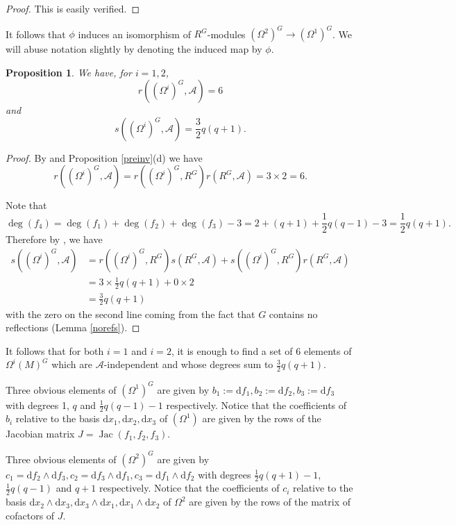 \documentclass[a4paper]{amsart}
\newcommand{\dd}{\mathrm{d}}
\def\Jac{\operatorname{Jac}}
\newtheorem{prop}[Lemma]{Proposition}
\newtheorem*{Corollary of Conjecture}{Corollary of Conjecture}
\theoremstyle{definition}
\theoremstyle{remark}
\theoremstyle{Acknowledgments}
\begin{document}
\begin{proof}
This is easily verified.
\end{proof}


It follows that $\phi$ induces an isomorphism of $R^G$-modules $(\Omega^2)^G \rightarrow (\Omega^1)^G$. We will abuse notation slightly by denoting the induced map by $\phi$.

\begin{prop}
We have, for $i=1,2$,
\[r((\Omega^i)^G,\mathcal{A}) = 6\]
and
\[s((\Omega^i)^G,\mathcal{A}) = \frac32 q(q+1).\]
\end{prop}

\begin{proof}
By \cite[Lemma~1]{BroerChuaiRelative} and Proposition \ref{preinv}(d) we have
$$r((\Omega^i)^G,\mathcal{A}) = r((\Omega^i)^G,R^G)r(R^G,\mathcal{A}) = 3 \times 2 = 6.$$

Note that $$\deg(f_4) = \deg(f_1)+\deg(f_2)+\deg(f_3) - 3 = 2+(q+1)+\frac12q(q-1)-3= \frac12 q(q+1).$$ Therefore by \cite[Lemma~1, Theorem~1]{BroerChuaiRelative}, we have
\begin{align*}
s((\Omega^i)^G,\mathcal{A}) &= r((\Omega^i)^G,R^G)s(R^G,\mathcal{A})+s((\Omega^i)^G,R^G)r(R^G,\mathcal{A})\\
&= 3 \times \frac12 q(q+1) + 0 \times 2\\
&=  \frac32 q(q+1)
\end{align*}
with the zero on the second line coming from the fact that $G$ contains no reflections (Lemma \ref{norefs}).
\end{proof}

It follows that for both $i=1$ and $i=2$, it is enough to find a set of 6 elements of $\Omega^i(M)^G$ which are $\mathcal{A}$-independent and whose degrees sum to $\frac32 q(q+1).$

Three obvious elements of $(\Omega^1)^G$ are given by $b_1:=\dd f_1, b_2:=\dd f_2,b_3:=\dd f_3$ with degrees 1, $q$ and $\frac12q(q-1)-1$ respectively.  Notice that the coefficients of $b_i$ relative to the basis $\dd x_1,\dd x_2,\dd x_3$ of $(\Omega^1)$ are given by the rows of the Jacobian matrix $J = \Jac(f_1,f_2,f_3)$.

Three obvious elements of $(\Omega^2)^G$ are given by $c_1 = \dd f_2 \wedge \dd f_3, c_2= \dd f_3 \wedge \dd f_1, c_3= \dd f_1 \wedge \dd f_2$ with degrees $\frac12q (q+1)-1$, $\frac12 q(q-1)$ and $q+1$ respectively. Notice that the coefficients of $c_i$ relative to the  basis $\dd x_2 \wedge \dd x_3, \dd x_3 \wedge \dd x_1, \dd x_1 \wedge \dd x_2$ of $\Omega^2$ are given by the rows of the matrix of cofactors of $J$.
\end{document}

